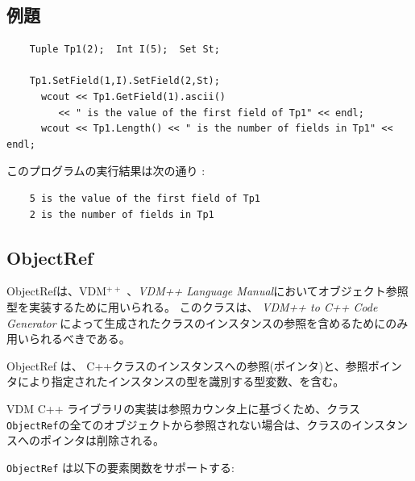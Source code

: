 \documentclass[\pformat,12pt]{jarticle}
\begin{document}
\subsection*{例題}

\begin{verbatim}
    Tuple Tp1(2);  Int I(5);  Set St;

    Tp1.SetField(1,I).SetField(2,St);
      wcout << Tp1.GetField(1).ascii() 
         << " is the value of the first field of Tp1" << endl;
      wcout << Tp1.Length() << " is the number of fields in Tp1" << endl;
\end{verbatim}


\noindent このプログラムの実行結果は次の通り :

\begin{verbatim}
    5 is the value of the first field of Tp1
    2 is the number of fields in Tp1
\end{verbatim}

\subsection{ObjectRef}

ObjectRefは、VDM$^{++}$ \cite{AFROCGEDLRM}、{\it VDM++ Language Manual}\cite{LangManPP-SCSK}においてオブジェクト参照型を実装するために用いられる。
このクラスは、 {\it VDM++ to C++ Code Generator} \cite{CGManPP-SCSK}によって生成されたクラスのインスタンスの参照を含めるためにのみ用いられるべきである。

ObjectRef は、 C++クラスのインスタンスへの参照(ポインタ)と、参照ポインタにより指定されたインスタンスの型を識別する型変数、を含む。

VDM C++ ライブラリの実装は参照カウンタ上に基づくため、クラス \texttt{ObjectRef}の全てのオブジェクトから参照されない場合は、クラスのインスタンスへのポインタは削除される。




{\tt ObjectRef} は以下の要素関数をサポートする:
\end{document}
